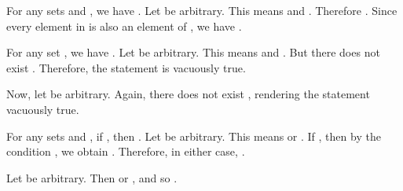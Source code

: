 \startchapter [title={Exercises for 2019-09-10}]
	
	\startproposition [title={Exercise 1.8}]
		For any sets  and , we have .
	\stopproposition
	\startproof
		Let  be arbitrary. This means  and . Therefore . Since every element in  is also an element of , we have .
	\stopproof

	\startproposition [title={Exercise 1.10}]
		For any set , we have .
	\stopproposition
	\startproof
		Let  be arbitrary. This means  and . But there does not exist . Therefore, the statement is vacuously true.

		Now, let  be arbitrary. Again, there does not exist , rendering the statement vacuously true.
	\stopproof

	\startproposition [title={Exercise 1.13}]
		For any sets  and , if , then .
	\stopproposition
	\startproof
		Let  be arbitrary. This means  or . If , then by the condition , we obtain . Therefore, in either case, .

		Let  be arbitrary. Then  or , and so .
	\stopproof


\stopchapter
